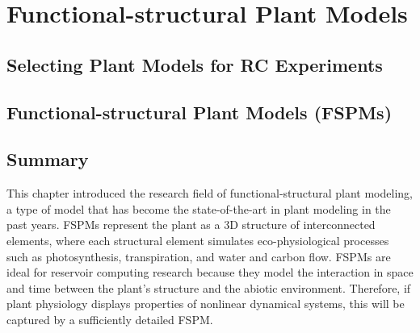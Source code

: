 
\chapter{Functional-structural Plant Models} \label{chapter:fspm}

 \label{fspm:why}

\section{Selecting Plant Models for RC Experiments} \label{fspm:selecting-models-for-rc}

 

\section{Functional-structural Plant Models (FSPMs)} \label{fspm:fspm-intro}




% 

\section{Summary}

This chapter introduced the research field of functional-structural plant modeling, a type of model that has become the state-of-the-art in plant modeling in the past years.
FSPMs represent the plant as a 3D structure of interconnected elements, where each structural element simulates eco-physiological processes such as photosynthesis, transpiration, and water and carbon flow.
FSPMs are ideal for reservoir computing research because they model the interaction in space and time between the plant's structure and the abiotic environment.
Therefore, if plant physiology displays properties of nonlinear dynamical systems, this will be captured by a sufficiently detailed FSPM.